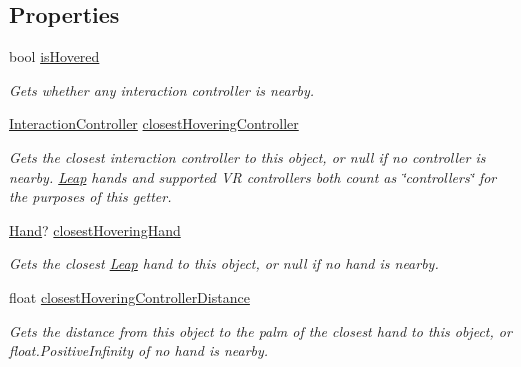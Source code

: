 \subsection*{Properties}
\begin{DoxyCompactItemize}
\item 
bool \mbox{\hyperlink{class_leap_1_1_unity_1_1_interaction_1_1_interaction_behaviour_ae8875ff423f6183c256101320ff28fa7}{is\+Hovered}}
\begin{DoxyCompactList}\small\item\em Gets whether any interaction controller is nearby. \end{DoxyCompactList}\item 
\mbox{\hyperlink{class_leap_1_1_unity_1_1_interaction_1_1_interaction_controller}{Interaction\+Controller}} \mbox{\hyperlink{class_leap_1_1_unity_1_1_interaction_1_1_interaction_behaviour_af6a50b78ed79f3e69a2ce6b228319563}{closest\+Hovering\+Controller}}
\begin{DoxyCompactList}\small\item\em Gets the closest interaction controller to this object, or null if no controller is nearby. \mbox{\hyperlink{namespace_leap_1_1_unity_1_1_leap}{Leap}} hands and supported VR controllers both count as \char`\"{}controllers\char`\"{} for the purposes of this getter. \end{DoxyCompactList}\item 
\mbox{\hyperlink{class_leap_1_1_hand}{Hand}}? \mbox{\hyperlink{class_leap_1_1_unity_1_1_interaction_1_1_interaction_behaviour_aeee4285667a660b5d1f8c49268eee4a5}{closest\+Hovering\+Hand}}
\begin{DoxyCompactList}\small\item\em Gets the closest \mbox{\hyperlink{namespace_leap_1_1_unity_1_1_leap}{Leap}} hand to this object, or null if no hand is nearby. \end{DoxyCompactList}\item 
float \mbox{\hyperlink{class_leap_1_1_unity_1_1_interaction_1_1_interaction_behaviour_aefe390893dcb760876ebf2ad2da4ccb2}{closest\+Hovering\+Controller\+Distance}}
\begin{DoxyCompactList}\small\item\em Gets the distance from this object to the palm of the closest hand to this object, or float.\+Positive\+Infinity of no hand is nearby. \end{DoxyCompactList}\item 

\end{DoxyCompactItemize}
